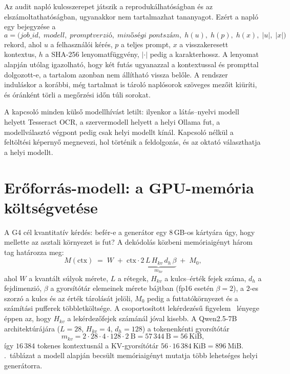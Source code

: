 Az audit napló kulcsszerepet játszik a reprodukálhatóságban és az elszámoltathatóságban, ugyanakkor
nem tartalmazhat tananyagot. Ezért a napló egy bejegyzése a
\begin{equation}
a=\bigl(\textit{job\_id},\;\textit{modell},\;\textit{promptverzió},\;\textit{minőségi pontszám},\;
h(u),\;h(p),\;h(x),\;|u|,\;|x|\bigr)
\end{equation}
rekord, ahol $u$ a felhasználói kérés, $p$ a teljes prompt, $x$ a visszakeresett kontextus, $h$ a SHA-256
lenyomatfüggvény, $|\cdot|$ pedig a karakterhossz. A lenyomat alapján utólag igazolható, hogy két futás
ugyanazzal a kontextussal és prompttal dolgozott-e, a tartalom azonban nem állítható vissza belőle. A
rendszer induláskor a korábbi, még tartalmat is tároló naplósorok szöveges mezőit kiüríti, és óránként
törli a megőrzési időn túli sorokat.

A  kapcsoló minden külső modellhívást letilt: ilyenkor a látás--nyelvi modell helyett
Tesseract OCR, a szervermodell helyett a helyi Ollama fut, a modellválasztó végpont pedig csak helyi
modellt kínál. Kapcsoló nélkül a feltöltési képernyő megnevezi, hol történik a feldolgozás, és az oktató
választhatja a helyi modellt.

\section{Erőforrás-modell: a GPU-memória költségvetése}
\label{sec:vram}

A G4 cél kvantitatív kérdés: befér-e a generátor egy 8\,GB-os kártyára úgy, hogy mellette az asztali
környezet is fut? A dekódolás közbeni memóriaigényt három tag határozza meg:
\begin{equation}
M(\mathrm{ctx}) \;=\; W \;+\; \mathrm{ctx}\cdot \underbrace{2\,L\,H_{kv}\,d_h\,\beta}_{\textstyle m_{kv}} \;+\; M_0,
\label{eq:vram}
\end{equation}
ahol $W$ a kvantált súlyok mérete, $L$ a rétegek, $H_{kv}$ a kulcs--érték fejek száma, $d_h$ a fejdimenzió,
$\beta$ a gyorsítótár elemeinek mérete bájtban (fp16 esetén $\beta=2$), a $2$-es szorzó a kulcs és az érték
tárolását jelöli, $M_0$ pedig a futtatókörnyezet és a számítási pufferek többletköltsége. A
csoportosított lekérdezésű figyelem~\cite{ainslie2023gqa} lényege éppen az, hogy $H_{kv}$ a
lekérdezőfejek számánál jóval kisebb. A Qwen2.5-7B~\cite{qwen25} architektúrájára ($L=28$, $H_{kv}=4$,
$d_h=128$) a tokenenkénti gyorsítótár
\begin{equation}
m_{kv}=2\cdot 28\cdot 4\cdot 128\cdot 2\ \text{B}=57\,344\ \text{B}=56\ \text{KiB},
\end{equation}
így $16\,384$ tokenes kontextusnál a KV-gyorsítótár $56\cdot 16\,384\ \text{KiB}=896\ \text{MiB}$.
\Az{\ref{tab:budget}}.~táblázat a modell alapján becsült memóriaigényt mutatja több lehetséges helyi
generátorra.


